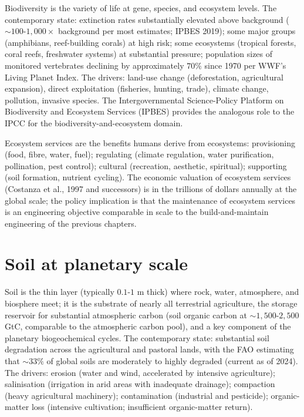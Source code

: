 Biodiversity is the variety of life at gene, species, and ecosystem levels. The contemporary state: extinction rates substantially elevated above background ($\sim 100$-$1{,}000\times$ background per most estimates; IPBES 2019); some major groups (amphibians, reef-building corals) at high risk; some ecosystems (tropical forests, coral reefs, freshwater systems) at substantial pressure; population sizes of monitored vertebrates declining by approximately $70\%$ since 1970 per WWF's Living Planet Index. The drivers: land-use change (deforestation, agricultural expansion), direct exploitation (fisheries, hunting, trade), climate change, pollution, invasive species. The Intergovernmental Science-Policy Platform on Biodiversity and Ecosystem Services (IPBES) provides the analogous role to the IPCC for the biodiversity-and-ecosystem domain.

Ecosystem services are the benefits humans derive from ecosystems: provisioning (food, fibre, water, fuel); regulating (climate regulation, water purification, pollination, pest control); cultural (recreation, aesthetic, spiritual); supporting (soil formation, nutrient cycling). The economic valuation of ecosystem services (Costanza et al., 1997 and successors) is in the trillions of dollars annually at the global scale; the policy implication is that the maintenance of ecosystem services is an engineering objective comparable in scale to the build-and-maintain engineering of the previous chapters.

\section{Soil at planetary scale}

Soil is the thin layer (typically $0.1$-$1$ m thick) where rock, water, atmosphere, and biosphere meet; it is the substrate of nearly all terrestrial agriculture, the storage reservoir for substantial atmospheric carbon (soil organic carbon at $\sim 1{,}500$-$2{,}500$ GtC, comparable to the atmospheric carbon pool), and a key component of the planetary biogeochemical cycles. The contemporary state: substantial soil degradation across the agricultural and pastoral lands, with the FAO estimating that $\sim 33\%$ of global soils are moderately to highly degraded (current as of 2024). The drivers: erosion (water and wind, accelerated by intensive agriculture); salinisation (irrigation in arid areas with inadequate drainage); compaction (heavy agricultural machinery); contamination (industrial and pesticide); organic-matter loss (intensive cultivation; insufficient organic-matter return).

